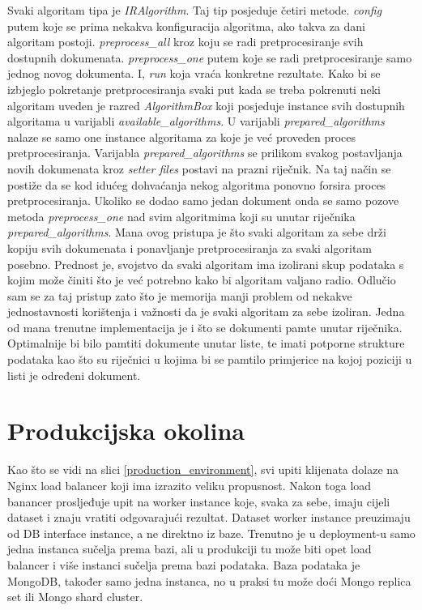 \documentclass[a4paper,12pt]{article}
\begin{document}
Svaki algoritam tipa je \textit{IRAlgorithm}. Taj tip posjeduje četiri metode. \textit{config} putem koje se prima nekakva konfiguracija algoritma, ako takva za dani algoritam postoji. \textit{preprocess\_all} kroz koju se radi pretprocesiranje svih dostupnih dokumenata. \textit{preprocess\_one} putem koje se radi pretprocesiranje samo jednog novog dokumenta. I, \textit{run} koja vraća konkretne rezultate. Kako bi se izbjeglo pokretanje pretprocesiranja svaki put kada se treba pokrenuti neki algoritam uveden je razred \textit{AlgorithmBox} koji posjeduje instance svih dostupnih algoritama u varijabli \textit{available\_algorithms}. U varijabli \textit{prepared\_algorithms} nalaze se samo one instance algoritama za koje je već proveden proces pretprocesiranja. Varijabla \textit{prepared\_algorithms} se prilikom svakog postavljanja novih dokumenata kroz \textit{setter files} postavi na prazni riječnik. Na taj način se postiže da se kod idućeg dohvaćanja nekog algoritma ponovno forsira proces pretprocesiranja. Ukoliko se dodao samo jedan dokument onda se samo pozove metoda \textit{preprocess\_one} nad svim algoritmima koji su unutar riječnika \textit{prepared\_algorithms}. Mana ovog pristupa je što svaki algoritam za sebe drži kopiju svih dokumenata i ponavljanje pretprocesiranja za svaki algoritam posebno. Prednost je, svojstvo da svaki algoritam ima izolirani skup podataka s kojim može činiti što je već potrebno kako bi algoritam valjano radio. Odlučio sam se za taj pristup zato što je memorija manji problem od nekakve jednostavnosti korištenja i važnosti da je svaki algoritam za sebe izoliran. Jedna od mana trenutne implementacija je i što se dokumenti pamte unutar riječnika. Optimalnije bi bilo pamtiti dokumente unutar liste, te imati potporne strukture podataka kao što su riječnici u kojima bi se pamtilo primjerice na kojoj poziciji u listi je određeni dokument.

\section{Produkcijska okolina}

Kao što se vidi na slici \ref{production_environment}, svi upiti klijenata dolaze na Nginx load balancer koji ima izrazito veliku propusnost. Nakon toga load banancer prosljeđuje upit na worker instance koje, svaka za sebe, imaju cijeli dataset i znaju vratiti odgovarajući rezultat. Dataset worker instance preuzimaju od DB interface instance, a ne direktno iz baze. Trenutno je u deployment-u samo jedna instanca sučelja prema bazi, ali u produkciji tu može biti opet load balancer i više instanci sučelja prema bazi podataka. Baza podataka je MongoDB, također samo jedna instanca, no u praksi tu može doći Mongo replica set ili Mongo shard cluster.
\end{document}
